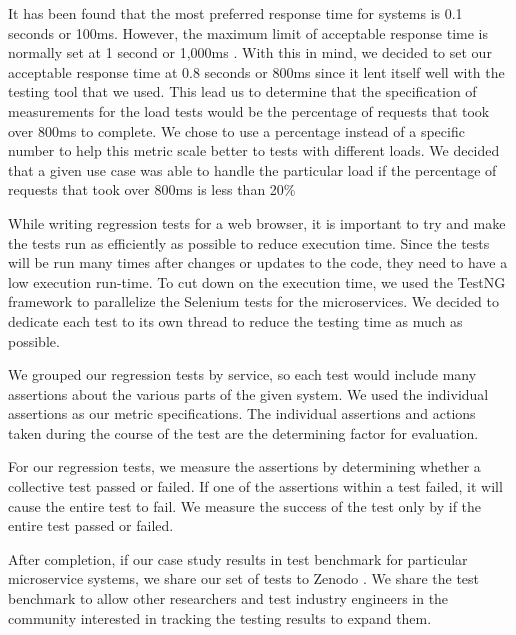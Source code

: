 It has been found that the most preferred response time for systems is 0.1 seconds or 100ms. However, the maximum limit of acceptable response time is normally set at 1 second or 1,000ms \cite{hamilton2023response}. With this in mind, we decided to set our acceptable response time at 0.8 seconds or 800ms since it lent itself well with the testing tool that we used. This lead us to determine that the specification of measurements for the load tests would be the percentage of requests that took over 800ms to complete. We chose to use a percentage instead of a specific number to help this metric scale better to tests with different loads. We decided that a given use case was able to handle the particular load if the percentage of requests that took over 800ms is less than 20\%


While writing regression tests for a web browser, it is important to try and make the tests run as efficiently as possible to reduce execution time. Since the tests will be run many times after changes or updates to the code, they need to have a low execution run-time. To cut down on the execution time, we used the TestNG framework to parallelize  the Selenium tests for the microservices. We decided to dedicate each test to its own thread to reduce the testing time as much as possible.

We grouped our regression tests by service, so each test would include many assertions about the various parts of the given system. We used the individual assertions as our metric specifications. The individual assertions and actions taken during the course of the test are the determining factor for evaluation.

For our regression tests, we measure the assertions by determining whether a collective test passed or failed. If one of the assertions within a test failed, it will cause the entire test to fail. We measure the success of the test only by if the entire test passed or failed. 

After completion, if our case study results in test benchmark for particular microservice systems, we share our set of tests to Zenodo \cite{zenodo_benchmark}. %
%
We share the test benchmark to allow other researchers and test industry engineers in the community interested in tracking the testing results to expand them. 

